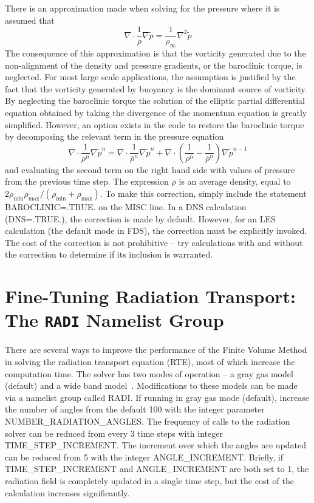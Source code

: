 \documentclass[11pt]{book}
\newcommand{\tp}{\tilde{p}}
\newcommand{\be}{\begin{equation}}
\newcommand{\ee}{\end{equation}}
\begin{document}
There is an approximation made when solving for the pressure where
it is assumed that
\be \nabla \cdot \frac{1}{\rho} \nabla \tp = \frac{1}{\rho_\infty} \nabla^2 \tp \label{Happrox} \ee
The consequence of this approximation is that the vorticity generated
due to the non-alignment of the density and pressure gradients, or the
baroclinic torque, is neglected. For most large scale applications,
the assumption is justified by the fact that the vorticity generated by
buoyancy is the dominant source of vorticity.
By neglecting the baroclinic torque the
solution of the elliptic partial differential equation obtained by
taking the divergence of the momentum equation is greatly simplified.
However, an option exists in the code to restore the baroclinic torque by
decomposing the relevant term in the pressure equation
\be \nabla \cdot \frac{1}{\rho^n} \nabla \tp^n = \nabla \cdot \frac{1}{\overline{\rho}^n} \nabla \tp^n +
   \nabla \cdot \left( \frac{1}{\rho^n} - \frac{1}{\overline{\rho}^n} \right) \nabla \tp^{n-1}   \ee
and evaluating the second term on the right hand side with values of
pressure from the
previous time step. The expression $\overline{\rho}$ is an average density,
equal to $2 \rho_{\min} \rho_{\max} / (\rho_{\min} + \rho_{\max})$.
To make this correction, simply include the statement {\ct BAROCLINIC=.TRUE.}
on the {\ct MISC} line. In a DNS calculation ({\ct DNS=.TRUE.}), the
correction is made by default. However, for an LES calculation (the default mode in FDS),
the correction must be explicitly invoked. The cost of the
correction is not prohibitive -- try calculations
with and without the correction to determine if its inclusion is
warranted.


\section{Fine-Tuning Radiation Transport: The \texorpdfstring{{\tt RADI}}{RADI} Namelist Group}%
\label{info:RADI}

There are several ways to improve the performance of the Finite Volume
Method in solving the radiation transport equation (RTE), most of which
increase the computation time. The solver has two modes of
operation -- a gray gas model (default) and a wide band model~\cite{FDS_Tech_Guide_4}.
Modifications to these models can be made via a namelist group called
{\ct RADI}. If running in gray gas mode (default), increase the number
of angles from the default 100 with the integer parameter
{\ct NUMBER\_RADIATION\_ANGLES}. The frequency of calls to the radiation
solver can be reduced from every 3 time steps with integer
{\ct TIME\_STEP\_INCREMENT}. The increment over which the angles are
updated can be reduced from 5 with the integer {\ct ANGLE\_INCREMENT}.
Briefly, if {\ct TIME\_STEP\_INCREMENT} and {\ct ANGLE\_INCREMENT} are
both set to 1, the radiation field is completely updated in a single
time step, but the cost of the calculation increases significantly.
\end{document}

